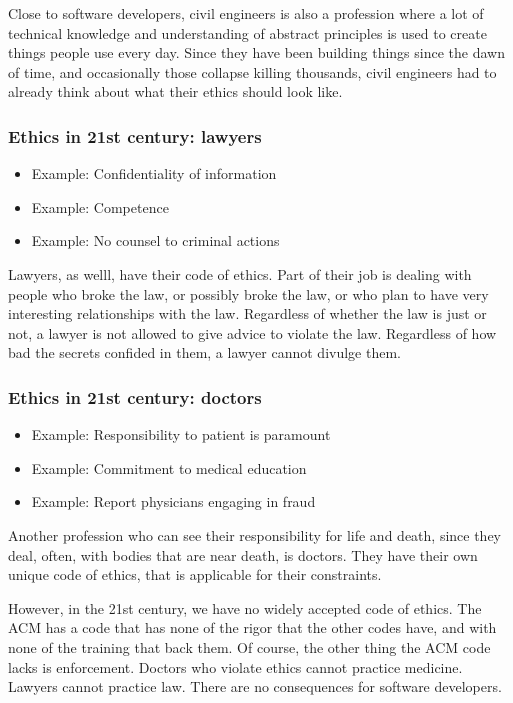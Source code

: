 Close to software developers,
civil engineers is also a profession where a lot of technical knowledge
and understanding of abstract principles is used to create
things people use every day.
Since they have been building things since the dawn of time,
and occasionally those collapse killing thousands,
civil engineers had to already think about what their ethics should look like.

\begin{frame}[fragile]
\frametitle{Ethics in 21st century: lawyers}

\begin{itemize}
\item Example: Confidentiality of information\pause
\item Example: Competence\pause
\item Example: No counsel to criminal actions
\end{itemize}

\end{frame}

Lawyers,
as welll,
have their code of ethics.
Part of their job is dealing with people who broke the law,
or possibly broke the law,
or who plan to have very interesting relationships with the law.
Regardless of whether the law is just or not,
a lawyer is not allowed to give advice to violate the law.
Regardless of how bad the secrets confided in them,
a lawyer cannot divulge them.

\begin{frame}[fragile]
\frametitle{Ethics in 21st century: doctors}

\begin{itemize}
\item Example: Responsibility to patient is paramount\pause
\item Example: Commitment to medical education\pause
\item Example: Report physicians engaging in fraud
\end{itemize}

\end{frame}

Another profession who can see their responsibility
for life and death,
since they deal,
often,
with bodies that are near death,
is doctors.
They have their own unique code of ethics,
that is applicable for their constraints.

However,
in the 21st century,
we have no widely accepted code of ethics.
The ACM has a code that has none of the rigor
that the other codes have,
and with none of the training that back them.
Of course,
the other thing the ACM code lacks is enforcement.
Doctors who violate ethics cannot practice medicine.
Lawyers cannot practice law.
There are no consequences for software developers.


